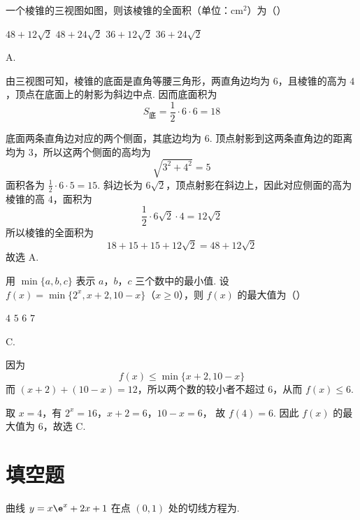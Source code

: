 \begin{problem}
一个棱锥的三视图如图，则该棱锥的全面积（单位：\(\mathrm{cm}^2\)）为（\quad）

\FloatBarrier

\choices
    {\(48 + 12\sqrt{2}\)}
    {\(48 + 24\sqrt{2}\)}
    {\(36 + 12\sqrt{2}\)}
    {\(36 + 24\sqrt{2}\)}
\end{problem}

\begin{answer}
A.
\end{answer}

\begin{solution}
由三视图可知，棱锥的底面是直角等腰三角形，两直角边均为 \(6\)，且棱锥的高为 \(4\)，顶点在底面上的射影为斜边中点. 因而底面积为
\[
S_{\text{底}}=\frac12\cdot6\cdot6=18
\]

底面两条直角边对应的两个侧面，其底边均为 \(6\). 顶点射影到这两条直角边的距离均为 \(3\)，所以这两个侧面的高均为
\[
\sqrt{3^{2}+4^{2}}=5
\]
面积各为 \(\frac12\cdot6\cdot5=15\). 斜边长为 \(6\sqrt2\)，顶点射影在斜边上，因此对应侧面的高为棱锥的高 \(4\)，面积为
\[
\frac12\cdot6\sqrt2\cdot4=12\sqrt2
\]
所以棱锥的全面积为
\[
18+15+15+12\sqrt2=48+12\sqrt2
\]
故选 A.
\end{solution}

\begin{problem}
用 \(\min \{a, b, c\}\) 表示 \(a\)，\(b\)，\(c\) 三个数中的最小值. 设 \(f(x) = \min \{2^x, x + 2, 10 - x\}\)（\(x \geqslant 0\)），则 \(f(x)\) 的最大值为（\quad）

\choices
    {\(4\)}
    {\(5\)}
    {\(6\)}
    {\(7\)}
\end{problem}

\begin{answer}
C.
\end{answer}

\begin{solution}
因为
\[
f(x)\leqslant\min\{x+2,10-x\}
\]
而 \((x+2)+(10-x)=12\)，所以两个数的较小者不超过 \(6\)，从而 \(f(x)\leqslant6\).

取 \(x=4\)，有
\(2^{x}=16\)，\(x+2=6\)，\(10-x=6\)，
故 \(f(4)=6\). 因此 \(f(x)\) 的最大值为 \(6\)，故选 C.
\end{solution}

\section{填空题}

\begin{problem}
曲线 \( y = x \e^{x} + 2x + 1 \) 在点 \((0,1)\) 处的切线方程为\fillinblank{}.
\end{problem}

